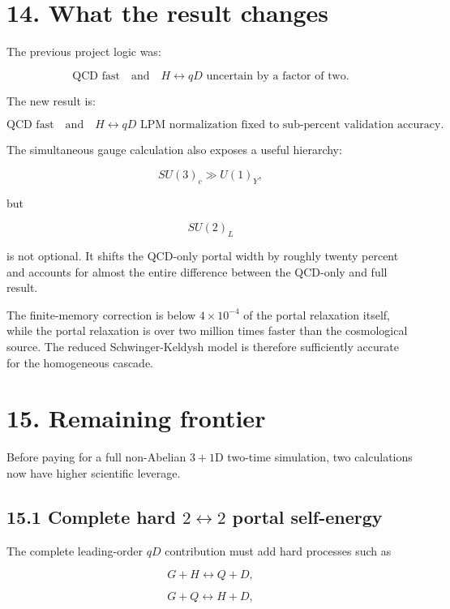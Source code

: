 \documentclass[
  10pt,
]{article}
\begin{document}
\section{14. What the result changes}\label{what-the-result-changes}

The previous project logic was:

\[
\text{QCD fast}
\quad\text{and}\quad
H\leftrightarrow qD\text{ uncertain by a factor of two}.
\]

The new result is:

\[
\boxed{
\text{QCD fast}
\quad\text{and}\quad
H\leftrightarrow qD\text{ LPM normalization fixed to sub-percent validation accuracy}.
}
\]

The simultaneous gauge calculation also exposes a useful hierarchy:

\[
SU(3)_c
\gg
U(1)_Y,
\]

but

\[
SU(2)_L
\]

is not optional. It shifts the QCD-only portal width by roughly twenty
percent and accounts for almost the entire difference between the
QCD-only and full result.

The finite-memory correction is below \(4\times10^{-4}\) of the portal
relaxation itself, while the portal relaxation is over two million times
faster than the cosmological source. The reduced Schwinger-Keldysh model
is therefore sufficiently accurate for the homogeneous cascade.

\section{15. Remaining frontier}\label{remaining-frontier}

Before paying for a full non-Abelian \(3+1\)D two-time simulation, two
calculations now have higher scientific leverage.

\subsection{\texorpdfstring{15.1 Complete hard \(2\leftrightarrow2\)
portal
self-energy}{15.1 Complete hard 2\textbackslash leftrightarrow2 portal self-energy}}\label{complete-hard-2leftrightarrow2-portal-self-energy}

The complete leading-order \(qD\) contribution must add hard processes
such as

\[
G+H\leftrightarrow Q+D,
\]

\[
G+Q\leftrightarrow H+D,
\]
\end{document}
